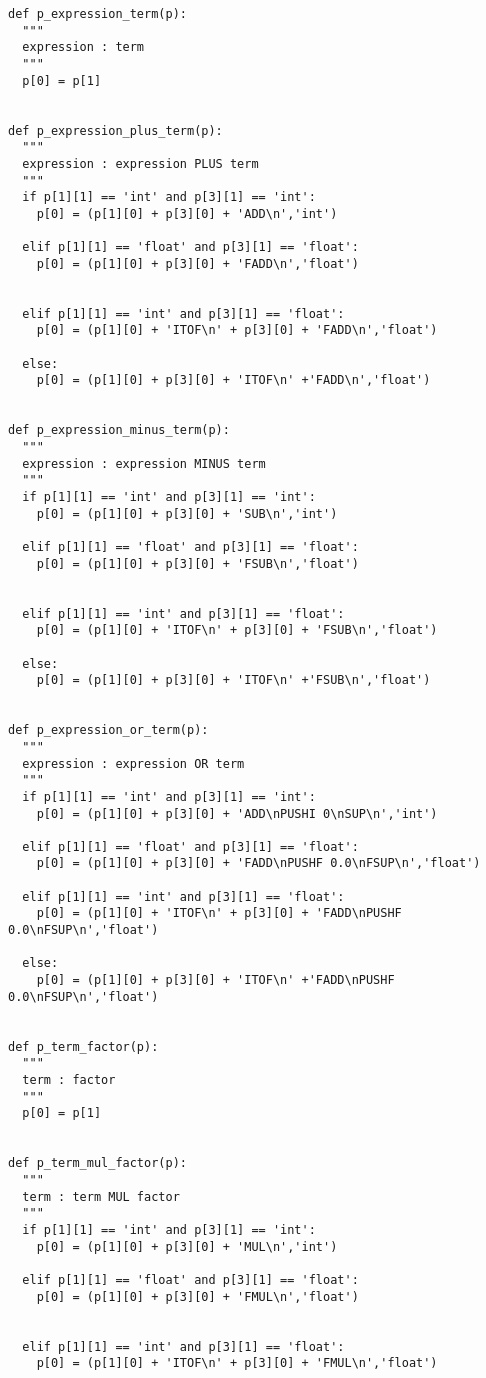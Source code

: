 \documentclass[11pt,a4paper]{report}%
\begin{document}
\begin{scriptsize}
\begin{verbatim}
def p_expression_term(p):
  """
  expression : term
  """
  p[0] = p[1]


def p_expression_plus_term(p):
  """
  expression : expression PLUS term
  """
  if p[1][1] == 'int' and p[3][1] == 'int':
    p[0] = (p[1][0] + p[3][0] + 'ADD\n','int')
  
  elif p[1][1] == 'float' and p[3][1] == 'float':
    p[0] = (p[1][0] + p[3][0] + 'FADD\n','float')

  
  elif p[1][1] == 'int' and p[3][1] == 'float':
    p[0] = (p[1][0] + 'ITOF\n' + p[3][0] + 'FADD\n','float')
  
  else:
    p[0] = (p[1][0] + p[3][0] + 'ITOF\n' +'FADD\n','float')


def p_expression_minus_term(p):
  """
  expression : expression MINUS term
  """
  if p[1][1] == 'int' and p[3][1] == 'int':
    p[0] = (p[1][0] + p[3][0] + 'SUB\n','int')
  
  elif p[1][1] == 'float' and p[3][1] == 'float':
    p[0] = (p[1][0] + p[3][0] + 'FSUB\n','float')

  
  elif p[1][1] == 'int' and p[3][1] == 'float':
    p[0] = (p[1][0] + 'ITOF\n' + p[3][0] + 'FSUB\n','float')
  
  else:
    p[0] = (p[1][0] + p[3][0] + 'ITOF\n' +'FSUB\n','float')


def p_expression_or_term(p):
  """
  expression : expression OR term
  """
  if p[1][1] == 'int' and p[3][1] == 'int':
    p[0] = (p[1][0] + p[3][0] + 'ADD\nPUSHI 0\nSUP\n','int')
  
  elif p[1][1] == 'float' and p[3][1] == 'float':
    p[0] = (p[1][0] + p[3][0] + 'FADD\nPUSHF 0.0\nFSUP\n','float')
  
  elif p[1][1] == 'int' and p[3][1] == 'float':
    p[0] = (p[1][0] + 'ITOF\n' + p[3][0] + 'FADD\nPUSHF 0.0\nFSUP\n','float')
  
  else:
    p[0] = (p[1][0] + p[3][0] + 'ITOF\n' +'FADD\nPUSHF 0.0\nFSUP\n','float')


def p_term_factor(p):
  """
  term : factor
  """
  p[0] = p[1]


def p_term_mul_factor(p):
  """
  term : term MUL factor
  """
  if p[1][1] == 'int' and p[3][1] == 'int':
    p[0] = (p[1][0] + p[3][0] + 'MUL\n','int')
  
  elif p[1][1] == 'float' and p[3][1] == 'float':
    p[0] = (p[1][0] + p[3][0] + 'FMUL\n','float')

  
  elif p[1][1] == 'int' and p[3][1] == 'float':
    p[0] = (p[1][0] + 'ITOF\n' + p[3][0] + 'FMUL\n','float')
  

\end{verbatim}
\end{scriptsize}
\end{document}
